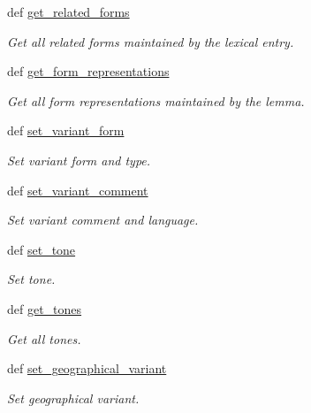 \begin{DoxyCompactItemize}
def \hyperlink{classlmf_1_1src_1_1core_1_1lexical__entry_1_1_lexical_entry_aee5b118b1015a35a5e8426235d325291}{get\+\_\+related\+\_\+forms}
\begin{DoxyCompactList}\small\item\em Get all related forms maintained by the lexical entry. \end{DoxyCompactList}\item 
def \hyperlink{classlmf_1_1src_1_1core_1_1lexical__entry_1_1_lexical_entry_a62717ccb205bcbea9a421cbc562068ce}{get\+\_\+form\+\_\+representations}
\begin{DoxyCompactList}\small\item\em Get all form representations maintained by the lemma. \end{DoxyCompactList}\item 
def \hyperlink{classlmf_1_1src_1_1core_1_1lexical__entry_1_1_lexical_entry_ab5ec3863b9c8623df7f41ad07332b2ec}{set\+\_\+variant\+\_\+form}
\begin{DoxyCompactList}\small\item\em Set variant form and type. \end{DoxyCompactList}\item 
def \hyperlink{classlmf_1_1src_1_1core_1_1lexical__entry_1_1_lexical_entry_a150a57b434161d86b8962b3ef7f0ff51}{set\+\_\+variant\+\_\+comment}
\begin{DoxyCompactList}\small\item\em Set variant comment and language. \end{DoxyCompactList}\item 
def \hyperlink{classlmf_1_1src_1_1core_1_1lexical__entry_1_1_lexical_entry_ad816834c160783393a4a60a71431886b}{set\+\_\+tone}
\begin{DoxyCompactList}\small\item\em Set tone. \end{DoxyCompactList}\item 
def \hyperlink{classlmf_1_1src_1_1core_1_1lexical__entry_1_1_lexical_entry_a5527aa1541a398941192ef5a5d400e8e}{get\+\_\+tones}
\begin{DoxyCompactList}\small\item\em Get all tones. \end{DoxyCompactList}\item 
def \hyperlink{classlmf_1_1src_1_1core_1_1lexical__entry_1_1_lexical_entry_a931ea014bba9cddfd2e1e9d4cdb1f40a}{set\+\_\+geographical\+\_\+variant}
\begin{DoxyCompactList}\small\item\em Set geographical variant. \end{DoxyCompactList}\item 

\end{DoxyCompactItemize}
